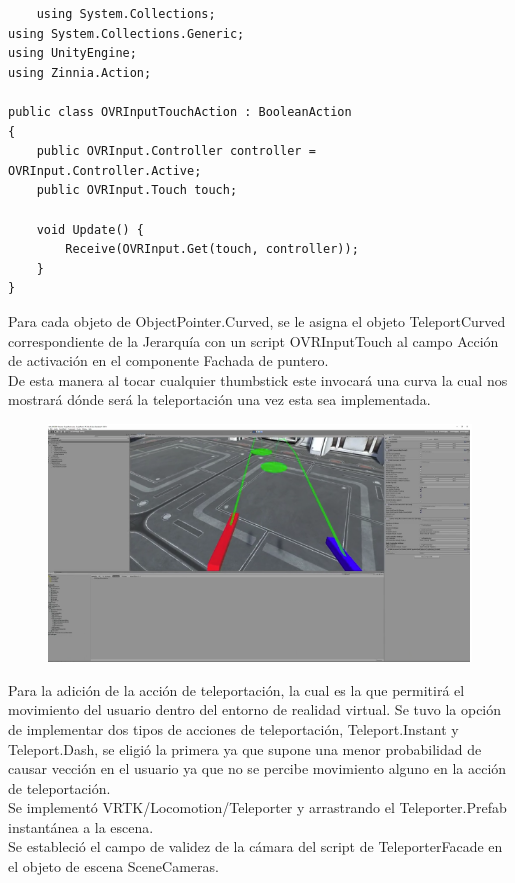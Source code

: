\begin{verbatim}
    using System.Collections;
using System.Collections.Generic;
using UnityEngine;
using Zinnia.Action;
 
public class OVRInputTouchAction : BooleanAction
{
    public OVRInput.Controller controller = OVRInput.Controller.Active;
    public OVRInput.Touch touch;
 
    void Update() {
        Receive(OVRInput.Get(touch, controller));
    }
}
\end{verbatim}
Para cada objeto de ObjectPointer.Curved, se le asigna el objeto TeleportCurved correspondiente de la Jerarquía con un script OVRInputTouch al campo Acción de activación en el componente Fachada de puntero.\\

De esta manera al tocar cualquier thumbstick este invocará una curva la cual nos mostrará dónde será la teleportación una vez esta sea implementada.\\
\begin{figure}[H]
	\begin{center}
 		\includegraphics[width = .5\textwidth]{source/images/image73.png}
	\end{center} 
\end{figure}

Para la adición de la acción de teleportación, la cual es la que permitirá el movimiento del usuario dentro del entorno de realidad virtual. Se tuvo la opción de implementar dos tipos de acciones de teleportación, Teleport.Instant y Teleport.Dash, se eligió la primera ya que supone una menor probabilidad de causar vección en el usuario ya que no se percibe movimiento alguno en la acción de teleportación.\\

Se implementó VRTK/Locomotion/Teleporter y arrastrando el Teleporter.Prefab instantánea a la escena.\\

Se estableció el campo de validez de la cámara del script de TeleporterFacade en el objeto de escena SceneCameras.\\

